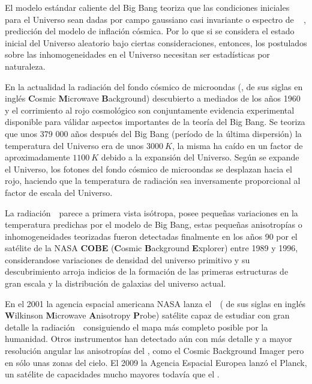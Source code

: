 El modelo estándar caliente del Big Bang teoriza que las condiciones iniciales para el Universo sean dadas por campo gaussiano casi invariante o espectro de \matterspectrum ~ \citep{rubakov_harrison--zeldovich_2009}, predicción del modelo de inflación cósmica. Por lo que si se considera el estado inicial del Universo aleatorio bajo ciertas consideraciones, entonces, los postulados sobre las inhomogeneidades en el Universo necesitan ser estadísticas por naturaleza. 

En la actualidad la radiación del fondo cósmico de microondas (\CMB, de sus siglas en inglés \textbf{C}osmic \textbf{M}icrowave \textbf{B}ackground) descubierto a mediados de los años 1960 y el corrimiento al rojo cosmológico son conjuntamente evidencia experimental disponible para válidar aspectos importantes de la teoría del Big Bang. Se teoriza que unos 379 000 años después del Big Bang (per\'iodo de la última dispersión) la temperatura del Universo era de unos $3000~K$, la misma ha caído en un factor de aproximadamente $1100~K$ debido a la expansión del Universo. Según se expande el Universo, los fotones del fondo cósmico de microondas se desplazan hacia el rojo, haciendo que la temperatura de radiación sea inversamente proporcional al factor de escala del Universo.

La radiación~\CMB~parece a primera vista isótropa, posee pequeñas variaciones en la temperatura predichas por el modelo de Big Bang, estas peque\~nas anisotropías o inhomogeneidades teorizadas fueron detectadas finalmente en los años 90 por el satélite de la NASA \textbf{COBE} (\textbf{C}osmic \textbf{B}ackground \textbf{E}xplorer) entre 1989 y 1996, considerandose variaciones de densidad del universo primitivo y su descubrimiento arroja indicios de la formación de las primeras estructuras de gran escala y la distribución de galaxias del universo actual. 

En el 2001 la agencia espacial americana NASA lanza el~\WMAP~( de sus siglas en inglés \textbf{W}ilkinson \textbf{M}icrowave \textbf{A}nisotropy \textbf{P}robe) satélite capaz de estudiar con gran detalle la radiación~\CMB~consiguiendo el mapa más completo posible por la humanidad. Otros instrumentos han detectado aún con más detalle y a mayor resolución angular las anisotropías del \CMB, como el Cosmic Background Imager pero en sólo unas zonas del cielo. %
El 2009 la Agencia Espacial Europea lanzó el Planck, un satélite de capacidades mucho mayores todavía que el \WMAP.

